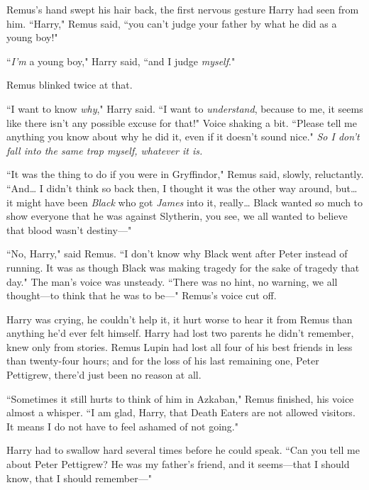 Remus's hand swept his hair back, the first nervous gesture Harry had seen from him. ``Harry," Remus said, ``you can't judge your father by what he did as a young boy!"

``\emph{I'm} a young boy," Harry said, ``and I judge \emph{myself}."

Remus blinked twice at that.

``I want to know \emph{why}," Harry said. ``I want to \emph{understand}, because to me, it seems like there isn't any possible excuse for that!" Voice shaking a bit. ``Please tell me anything you know about why he did it, even if it doesn't sound nice." \emph{So I don't fall into the same trap myself, whatever it is.}

``It was the thing to do if you were in Gryffindor," Remus said, slowly, reluctantly. ``And{\ldots} I didn't think so back then, I thought it was the other way around, but{\ldots} it might have been \emph{Black} who got \emph{James} into it, really{\ldots} Black wanted so much to show everyone that he was against Slytherin, you see, we all wanted to believe that blood wasn't destiny---"

\later

``No, Harry," said Remus. ``I don't know why Black went after Peter instead of running. It was as though Black was making tragedy for the sake of tragedy that day." The man's voice was unsteady. ``There was no hint, no warning, we all thought---to think that he was to be---" Remus's voice cut off.

Harry was crying, he couldn't help it, it hurt worse to hear it from Remus than anything he'd ever felt himself. Harry had lost two parents he didn't remember, knew only from stories. Remus Lupin had lost all four of his best friends in less than twenty-four hours; and for the loss of his last remaining one, Peter Pettigrew, there'd just been no reason at all.

``Sometimes it still hurts to think of him in Azkaban," Remus finished, his voice almost a whisper. ``I am glad, Harry, that Death Eaters are not allowed visitors. It means I do not have to feel ashamed of not going."

Harry had to swallow hard several times before he could speak. ``Can you tell me about Peter Pettigrew? He was my father's friend, and it seems---that I should know, that I should remember---"

